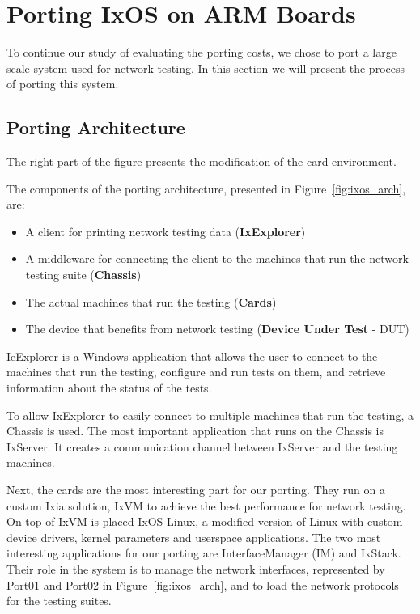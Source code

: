 \section{Porting IxOS on ARM Boards} \label{sec:portingIxos}

To continue our study of evaluating the porting costs, we chose to port a large
scale system used for network testing. In this section we will present the
process of porting this system. 

\subsection{Porting Architecture}

\begin{figure*}
    \centering
    \def\svgscale{0.95}
    
    \caption{IxOS porting architecture}
    \label{fig:ixos_arch}
    \medskip
    \small
    The right part of the figure presents the modification of the card
    environment.
\end{figure*}

The components of the porting architecture, presented in
Figure~\ref{fig:ixos_arch}, are:
\begin{itemize}
    \item A client for printing network testing data (\textbf{IxExplorer})
    \item A middleware for connecting the client to the machines that run the
    network testing suite (\textbf{Chassis})
    \item The actual machines that run the testing (\textbf{Cards})
    \item The device that benefits from network testing (\textbf{Device Under Test} - DUT)
\end{itemize}

IeExplorer is a Windows application that allows the user to connect to the
machines that run the testing, configure and run tests on them, and retrieve
information about the status of the tests.

To allow IxExplorer to easily connect to multiple machines that run the testing,
a Chassis is used. The most important application that runs on the Chassis is
IxServer. It creates a communication channel between IxServer and the testing
machines. 

Next, the cards are the most interesting part for our porting. They run on a
custom Ixia solution, IxVM to achieve the best performance for network testing. On top
of IxVM is placed IxOS Linux, a modified version of Linux with custom
device drivers, kernel parameters and userspace applications. The two most
interesting applications for our porting are InterfaceManager (IM) and IxStack.
Their role in the system is to manage the network interfaces, represented by
Port01 and Port02 in Figure~\ref{fig:ixos_arch}, and to load the network
protocols for the testing suites.

